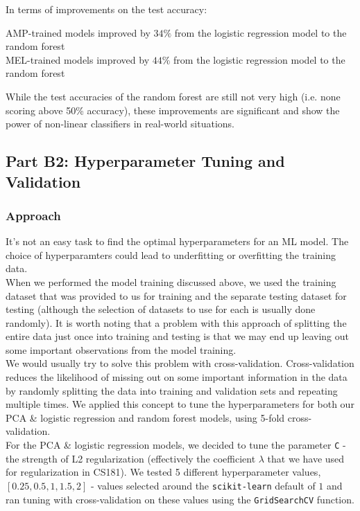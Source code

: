 \documentclass[11pt]{article}
\begin{document}
\noindent In terms of improvements on the test accuracy:
\begin{center}
    AMP-trained models improved by $34\%$ from the logistic regression model to the random forest\\ 
    MEL-trained models improved by $44\%$ from the logistic regression model to the random forest
\end{center}
While the test accuracies of the random forest are still not very high (i.e. none scoring above 50\% accuracy), these improvements are significant and show the power of non-linear classifiers in real-world situations.

\subsection{Part B2: Hyperparameter Tuning and Validation}

\subsubsection{Approach}
It's not an easy task to find the optimal hyperparameters for an ML model. The choice of hyperparamters could lead to underfitting or overfitting the training data.\\

\noindent When we performed the model training discussed above, we used the training dataset that was provided to us for training and the separate testing dataset for testing (although the selection of datasets to use for each is usually done randomly). It is worth noting that a problem with this approach of splitting the entire data just once into training and testing is that we may end up leaving out some important observations from the model training.\\

\noindent We would usually try to solve this problem with cross-validation. Cross-validation reduces the likelihood of missing out on some important information in the data by randomly splitting the data into training and validation sets and repeating multiple times. We applied this concept to tune the hyperparameters for both our PCA \& logistic regression and  random forest models, using 5-fold cross-validation.\\

\noindent For the PCA \& logistic regression models, we decided to tune the parameter \texttt{C} - the strength of L2 regularization (effectively the coefficient $\lambda$ that we have used for regularization in CS181). We tested 5 different hyperparameter values, $[0.25, 0.5, 1, 1.5, 2]$ - values selected around the \texttt{scikit-learn} default of $1$ and ran tuning with cross-validation on these values using the \texttt{GridSearchCV} function.\\
\end{document}
